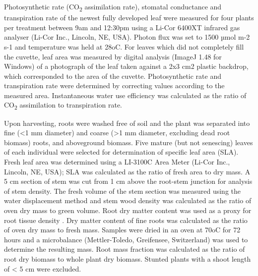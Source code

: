 \documentclass[12pt,a4paper]{memoir}
\begin{document}
Photosynthetic rate (CO\textsubscript{2} assimilation rate), stomatal conductance and transpiration rate of the newest fully developed leaf were measured for four plants per treatment between 9am and 12:30pm using a Li-Cor 6400XT infrared gas analyser (Li-Cor Inc., Lincoln, NE, USA). Photon flux was set to 1500 µmol m-2 s-1 and temperature was held at 28oC. For leaves which did not completely fill the cuvette, leaf area was measured by digital analysis (ImageJ 1.48 for Windows) of a photograph of the leaf taken against a 2x3 cm2 plastic backdrop, which corresponded to the area of the cuvette. Photosynthetic rate and transpiration rate were determined by correcting values according to the measured area. Instantaneous water use efficiency was calculated as the ratio of CO\textsubscript{2} assimilation to transpiration rate.

Upon harvesting, roots were washed free of soil and the plant was separated into fine (<1 mm diameter) and coarse (>1 mm diameter, excluding dead root biomass) roots, and aboveground biomass. Five mature (but not senescing) leaves of each individual were selected for determination of specific leaf area (SLA). Fresh leaf area was determined using a LI-3100C Area Meter (Li-Cor Inc., Lincoln, NE, USA); SLA was calculated as the ratio of fresh area to dry mass.  A 5 cm section of stem was cut from 1 cm above the root-stem junction for analysis of stem density. The fresh volume of the stem section was measured using the water displacement method and stem wood density was calculated as the ratio of oven dry mass to green volume. Root dry matter content was used as a proxy for root tissue density \citep{Birouste2013}. Dry matter content of fine roots was calculated as the ratio of oven dry mass to fresh mass. Samples were dried in an oven at 70oC for 72 hours and a microbalance (Mettler-Toledo, Greifensee, Switzerland) was used to determine the resulting mass. Root mass fraction was calculated as the ratio of root dry biomass to whole plant dry biomass. Stunted plants with a shoot length of < 5 cm were excluded.
\end{document}
